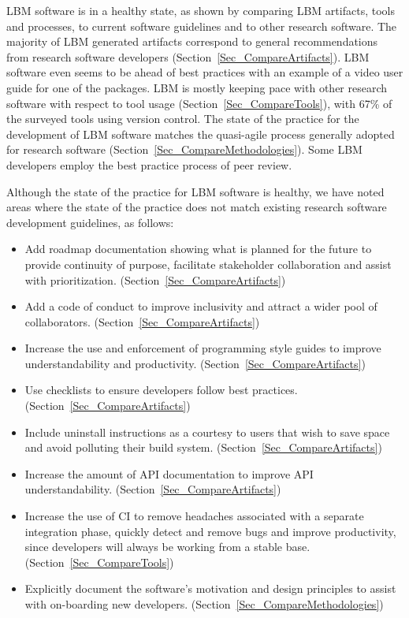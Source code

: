 \documentclass[final, 3p, times, authoryear]{elsarticle}
\begin{document}
LBM software is in a healthy state, as shown by comparing LBM artifacts, tools
and processes, to current software guidelines and to other research software.
The majority of LBM generated artifacts correspond to general recommendations
from research software developers (Section~\ref{Sec_CompareArtifacts}).  LBM
software even seems to be ahead of best practices with an example of a video
user guide for one of the packages. LBM is mostly keeping pace with other
research software with respect to tool usage (Section~\ref{Sec_CompareTools}),
with 67\% of the surveyed tools using version control.  The state of the
practice for the development of LBM software matches the quasi-agile process
generally adopted for research software
(Section~\ref{Sec_CompareMethodologies}).  Some LBM developers employ the best
practice process of peer review.

Although the state of the practice for LBM software is healthy, we have noted
areas where the state of the practice does not match existing research software
development guidelines, as follows:

\begin{itemize}
	\item Add roadmap documentation showing what is planned for the future to
	provide continuity of purpose, facilitate stakeholder collaboration and
	assist with prioritization. (Section~\ref{Sec_CompareArtifacts})
	\item Add a code of conduct to improve inclusivity and attract a wider pool
	of collaborators. (Section~\ref{Sec_CompareArtifacts})
	\item Increase the use and enforcement of programming style guides to improve understandability and productivity. (Section~\ref{Sec_CompareArtifacts})
	\item Use checklists to ensure developers follow best practices.
	(Section~\ref{Sec_CompareArtifacts})
	\item Include uninstall instructions as a courtesy to users that wish to
	save space and avoid polluting their build system.
	(Section~\ref{Sec_CompareArtifacts})
	\item Increase the amount of API documentation to improve API
	understandability. (Section~\ref{Sec_CompareArtifacts})
	\item Increase the use of CI to remove headaches associated with a separate
	integration phase, quickly detect and remove bugs and improve productivity,
	since developers will always be working from a stable base.
	(Section~\ref{Sec_CompareTools})
	\item Explicitly document the software's motivation and design principles to
	assist with on-boarding new developers.
	(Section~\ref{Sec_CompareMethodologies})
\end{itemize}
\end{document}
